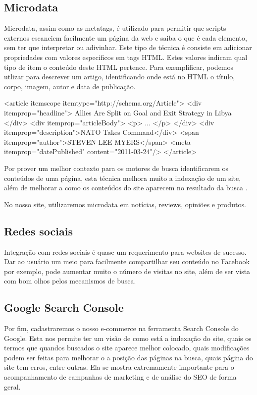 \subsection{Microdata}
Microdata, assim como as metatags, é utilizado para permitir que scripts externos escaneiem facilmente um página da web e saiba o que é cada elemento, sem ter que interpretar ou adivinhar. Este tipo de técnica é consiste em adicionar propriedades com valores especificos em tags HTML. Estes valores indicam qual tipo de item o conteúdo deste HTML pertence. Para exemplificar, podemos utlizar para descrever um artigo, identificando onde está no HTML o título, corpo, imagem, autor e data de publicação.

\begin{center}
  <article itemscope itemtype="http://schema.org/Article">
    <div itemprop="headline">
      Allies Are Split on Goal and 
      Exit Strategy in Libya
    </div>
    <div itemprop="articleBody"> 
      <p> ... </p>
    </div>
    <div itemprop="description">NATO Takes Command</div> 
    <span itemprop="author">STEVEN LEE MYERS</span> 
    <meta itemprop="datePublished" content="2011-03-24"/>
  </article>
\end{center}

Por prover um melhor contexto para os motores de busca identificarem os conteúdos de uma página, esta técnica melhora muito a indexação de um site, além de melhorar a como os conteúdos do site aparecem no resultado da busca \cite{Microdata}.

No nosso site, utilizaremos microdata em notícias, reviews, opiniões e produtos.

\subsection{Redes sociais}
Integração com redes sociais é quase um requerimento para websites de sucesso. Dar ao usuário um meio para facilmente compartilhar seu conteúdo no Facebook por exemplo, pode aumentar muito o número de visitas no site, além de ser vista com bom olhos pelos mecanismos de busca.

\subsection{Google Search Console}
Por fim, cadastraremos o nosso e-commerce na ferramenta Search Console do Google. Esta nos permite ter um visão de como está a indexação do site, quais os termos que quandos buscados o site aparece melhor colocado, quais modificações podem ser feitas para melhorar o a posição das páginas na busca, quais página do site tem erros, entre outras. Ela se mostra extremamente importante para o acompanhamento de campanhas de marketing e de análise do SEO de forma geral.
